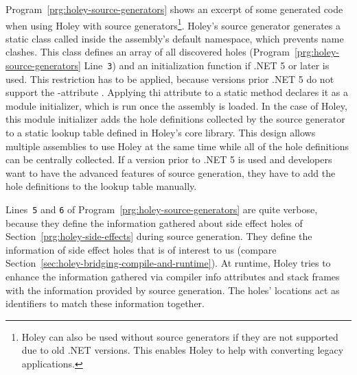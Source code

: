 Program~\ref{prg:holey-source-generators} shows an excerpt of some generated code when using Holey with source generators\footnote{Holey can also be used without source generators if they are not supported due to old .NET versions. This enables Holey to help with converting legacy applications.}.
Holey's source generator generates a static class called \texttt{} inside the assembly's default namespace, which prevents name clashes.
This class defines an array of all discovered holes (Program~\ref{prg:holey-source-generators} Line~\verb|3|) and an initialization function if .NET 5 or later is used.
This restriction has to be applied, because versions prior .NET 5 do not support the \texttt{\seqsplit{[ModuleInitializer]}}-attribute \cite{microsoft_module_2023}.
Applying thi attribute to a static method declares it as a module initializer, which is run once the assembly is loaded.
In the case of Holey, this module initializer adds the hole definitions collected by the source generator to a static lookup table defined in Holey's core library.
This design allows multiple assemblies to use Holey at the same time while all of the hole definitions can be centrally collected.
If a version prior to .NET 5 is used and developers want to have the advanced features of source generation, they have to add the hole definitions to the lookup table manually.

Lines~\verb|5| and \verb|6| of Program~\ref{prg:holey-source-generators} are quite verbose, because they define the information gathered about side effect holes of Section~\ref{prg:holey-side-effects} during source generation.
They define the information of side effect holes that is of interest to us (compare Section~\ref{sec:holey-bridging-compile-and-runtime}).
At runtime, Holey tries to enhance the information gathered via compiler info attributes and stack frames with the information provided by source generation.
The holes' locations act as identifiers to match these information together.

